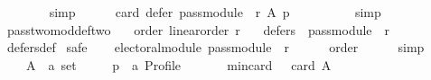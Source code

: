 \begin{isabellebody}
\ \ \ \ \ \ \isamarkupfalse%
\ simp\isanewline
\ \ \ \ \isamarkupfalse%
\ {\isachardoublequoteopen}card\ {\isacharparenleft}{\kern0pt}defer\ {\isacharparenleft}{\kern0pt}pass{\isacharunderscore}{\kern0pt}module\ {}\ r{\isacharparenright}{\kern0pt}\ A\ p{\isacharparenright}{\kern0pt}\ {\isacharequal}{\kern0pt}\ {}{\isachardoublequoteclose}\isanewline
\ \ \ \ \ \ \isamarkupfalse%
\ simp\isanewline
\ \ \isamarkupfalse%
\isanewline
{}\isamarkupfalse%
%
\endisatagproof
{\isafoldproof}%
%
\isadelimproof
\isanewline
%
\endisadelimproof
\isanewline
{}\isamarkupfalse%
\ pass{\isacharunderscore}{\kern0pt}two{\isacharunderscore}{\kern0pt}mod{\isacharunderscore}{\kern0pt}def{\isacharunderscore}{\kern0pt}two{\isacharcolon}{\kern0pt}\isanewline
\ \ \ order{\isacharcolon}{\kern0pt}\ {\isachardoublequoteopen}linear{\isacharunderscore}{\kern0pt}order\ r{\isachardoublequoteclose}\isanewline
\ \ \ {\isachardoublequoteopen}defers\ {}\ {\isacharparenleft}{\kern0pt}pass{\isacharunderscore}{\kern0pt}module\ {}\ r{\isacharparenright}{\kern0pt}{\isachardoublequoteclose}\isanewline
%
\isadelimproof
\ \ %
\endisadelimproof
%
\isatagproof
{}\isamarkupfalse%
\ defers{\isacharunderscore}{\kern0pt}def\isanewline
{}\isamarkupfalse%
\ {\isacharparenleft}{\kern0pt}safe{\isacharparenright}{\kern0pt}\isanewline
\ \ \isamarkupfalse%
\ {\isachardoublequoteopen}electoral{\isacharunderscore}{\kern0pt}module\ {\isacharparenleft}{\kern0pt}pass{\isacharunderscore}{\kern0pt}module\ {}\ r{\isacharparenright}{\kern0pt}{\isachardoublequoteclose}\isanewline
\ \ \ \ \isamarkupfalse%
\ order\isanewline
\ \ \ \ \isamarkupfalse%
\ simp\isanewline
{}\isamarkupfalse%
\isanewline
\ \ \isamarkupfalse%
\isanewline
\ \ \ \ A\ {\isacharcolon}{\kern0pt}{\isacharcolon}{\kern0pt}\ {\isachardoublequoteopen}{\isacharprime}{\kern0pt}a\ set{\isachardoublequoteclose}\ \isanewline
\ \ \ \ p\ {\isacharcolon}{\kern0pt}{\isacharcolon}{\kern0pt}\ {\isachardoublequoteopen}{\isacharprime}{\kern0pt}a\ Profile{\isachardoublequoteclose}\isanewline
\ \ \isamarkupfalse%
\isanewline
\ \ \ \ min{\isacharunderscore}{\kern0pt}{}{\isacharunderscore}{\kern0pt}card{\isacharcolon}{\kern0pt}\ {\isachardoublequoteopen}{}\ {\isasymle}\ card\ A{\isachardoublequoteclose}\ \isanewline

\end{isabellebody}
